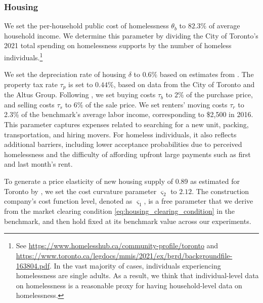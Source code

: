 \documentclass[parskip=full]{article}
\begin{document}
\subsubsection{Housing}

We set the per-household public cost of homelessness $\theta_{b}$ to $82.3\%$ of average household income. We determine this parameter by dividing the City of Toronto's 2021 total spending on homelessness supports by the number of homeless individuals.\footnote{See \url{https://www.homelesshub.ca/community-profile/toronto} and \url{https://www.toronto.ca/legdocs/mmis/2021/ex/bgrd/backgroundfile-163804.pdf}. In the vast majority of cases, individuals experiencing homelessness are single adults. As a result, we think that individual-level data on homelessness is a reasonable proxy for having household-level data on homelessness.}

We set the depreciation rate of housing $\delta$ to $0.6\%$ based on estimates from \citet{rosenthal-2014}. The property tax rate $\tau_p$ is set to $0.44\%$, based on data from the City of Toronto and the Altus Group. Following \citet{gm-2003}, we set buying costs $\tau_{b}$ to $2\%$ of the purchase price, and selling costs $\tau_{s}$ to $6\%$ of the sale price. We set renters’ moving costs $\tau_r$ to 2.3\% of the benchmark's average labor income, corresponding to \$2,500 in 2016. This parameter captures expenses related to searching for a new unit, packing, transportation, and hiring movers. For homeless individuals, it also reflects additional barriers, including lower acceptance probabilities due to perceived homelessness and the difficulty of affording upfront large payments such as first and last month’s rent.

To generate a price elasticity of new housing supply of 0.89 as estimated for Toronto by \citet{piaxao-2021}, we set the cost curvature parameter $\varsigma_{2}$ to $2.12$. The construction company's cost function level, denoted as $\varsigma_1$, is a free parameter that we derive from the market clearing condition \eqref{eq:housing_clearing_condition} in the benchmark, and then hold fixed at its benchmark value across our experiments.
\end{document}
